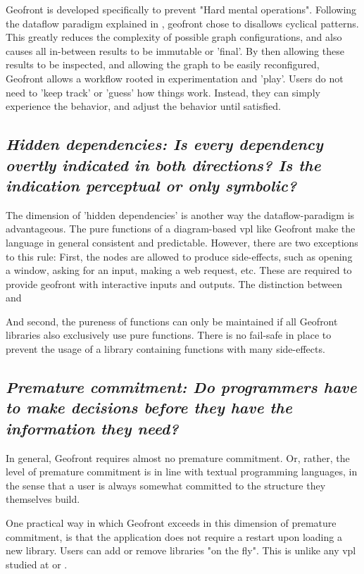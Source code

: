 Geofront is developed specifically to prevent "Hard mental operations".
Following the dataflow paradigm explained in , geofront chose to disallows cyclical patterns. 
This greatly reduces the complexity of possible graph configurations, and also causes all in-between results to be immutable or 'final'.
By then allowing these results to be inspected, and allowing the graph to be easily reconfigured, Geofront allows a workflow rooted in experimentation and 'play'.
Users do not need to 'keep track' or 'guess' how things work.
Instead, they can simply experience the behavior, and adjust the behavior until satisfied. 



\subsection*{\emph{Hidden dependencies: Is every dependency overtly indicated in both directions? Is the indication perceptual or only symbolic? }}

The dimension of 'hidden dependencies' is another way the dataflow-paradigm is advantageous. 
The pure functions of a diagram-based vpl like Geofront make the language in general consistent and predictable.
However, there are two exceptions to this rule:
First, the  nodes are allowed to produce side-effects, such as opening a window, asking for an input, making a web request, etc. 
These are required to provide geofront with interactive inputs and outputs.
The distinction between  and \m{}

And second, the pureness of functions can only be maintained if all Geofront libraries also exclusively use pure functions. 
There is no fail-safe in place to prevent the usage of a library containing functions with many side-effects. 

\subsection*{\emph{Premature commitment: Do programmers have to make decisions before they have the information they need? }}

In general, Geofront requires almost no premature commitment. 
Or, rather, the level of premature commitment is in line with textual programming languages, in the sense that a user is always somewhat committed to the structure they themselves build. 

One practical way in which Geofront exceeds in this dimension of premature commitment, is that the application does not require a restart upon loading a new library. 
Users can add or remove libraries "on the fly". 
This is unlike any vpl studied at  or .

